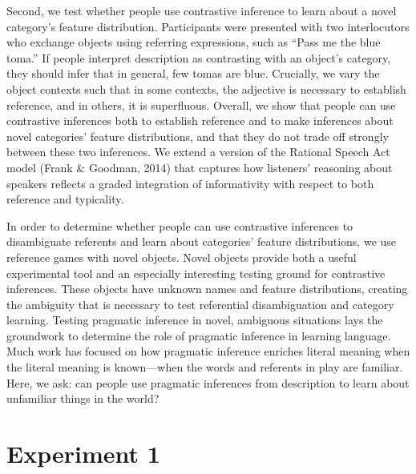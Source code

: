 \documentclass[
  english,
  man,floatsintext]{apa6}
\begin{document}
Second, we test whether people use contrastive inference to learn about a novel category's feature distribution. Participants were presented with two interlocutors who exchange objects using referring expressions, such as ``Pass me the blue toma.'' If people interpret description as contrasting with an object's category, they should infer that in general, few tomas are blue. Crucially, we vary the object contexts such that in some contexts, the adjective is necessary to establish reference, and in others, it is superfluous. Overall, we show that people can use contrastive inferences both to establish reference and to make inferences about novel categories' feature distributions, and that they do not trade off strongly between these two inferences. We extend a version of the Rational Speech Act model (Frank \& Goodman, 2014) that captures how listeners' reasoning about speakers reflects a graded integration of informativity with respect to both reference and typicality.

In order to determine whether people can use contrastive inferences to disambiguate referents and learn about categories' feature distributions, we use reference games with novel objects. Novel objects provide both a useful experimental tool and an especially interesting testing ground for contrastive inferences. These objects have unknown names and feature distributions, creating the ambiguity that is necessary to test referential disambiguation and category learning. Testing pragmatic inference in novel, ambiguous situations lays the groundwork to determine the role of pragmatic inference in learning language. Much work has focused on how pragmatic inference enriches literal meaning when the literal meaning is known---when the words and referents in play are familiar. Here, we ask: can people use pragmatic inferences from description to learn about unfamiliar things in the world?

\hypertarget{experiment-1}{%
\section{Experiment 1}\label{experiment-1}}
\end{document}
